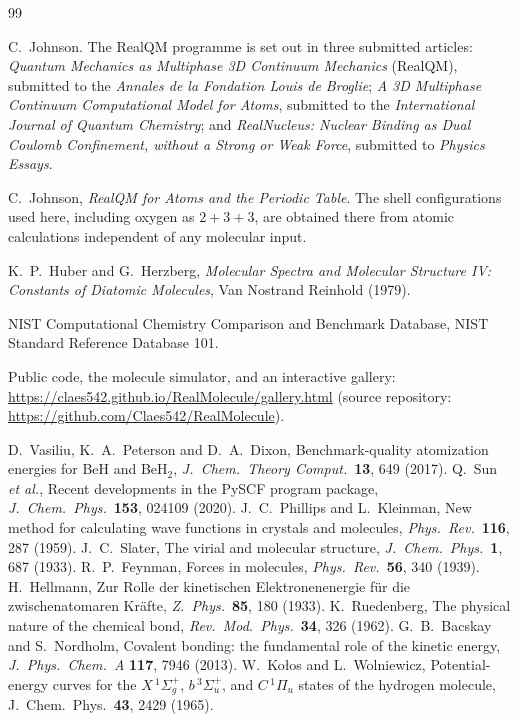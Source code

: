 \documentclass[11pt]{article}
\begin{document}
\begin{thebibliography}{99}

 C.\ Johnson. The RealQM programme is set out in three submitted articles:
\emph{Quantum Mechanics as Multiphase 3D Continuum Mechanics} (RealQM), submitted to the
\emph{Annales de la Fondation Louis de Broglie}; \emph{A 3D Multiphase Continuum Computational
Model for Atoms}, submitted to the \emph{International Journal of Quantum Chemistry}; and
\emph{RealNucleus: Nuclear Binding as Dual Coulomb Confinement, without a Strong or Weak Force},
submitted to \emph{Physics Essays}.

 C.\ Johnson, \emph{RealQM for Atoms and the Periodic Table}. The shell
configurations used here, including oxygen as $2{+}3{+}3$, are obtained there from atomic
calculations independent of any molecular input.

 K.\ P.\ Huber and G.\ Herzberg, \emph{Molecular Spectra and Molecular Structure
IV: Constants of Diatomic Molecules}, Van Nostrand Reinhold (1979).

 NIST Computational Chemistry Comparison and Benchmark Database, NIST Standard
Reference Database 101.

 Public code, the molecule simulator, and an interactive gallery:
\url{https://claes542.github.io/RealMolecule/gallery.html} (source repository:
\url{https://github.com/Claes542/RealMolecule}).

 D.\ Vasiliu, K.\ A.\ Peterson and D.\ A.\ Dixon, Benchmark-quality atomization energies
for BeH and BeH$_2$, \emph{J.\ Chem.\ Theory Comput.}\ \textbf{13}, 649 (2017).
 Q.\ Sun \emph{et al.}, Recent developments in the PySCF program package, \emph{J.\ Chem.\
  Phys.}\ \textbf{153}, 024109 (2020).
 J.\ C.\ Phillips and L.\ Kleinman, New method for calculating wave functions in crystals and
  molecules, \emph{Phys.\ Rev.}\ \textbf{116}, 287 (1959).
 J.\ C.\ Slater, The virial and molecular structure, \emph{J.\ Chem.\ Phys.}\
\textbf{1}, 687 (1933).
\bibitem{feynman} R.\ P.\ Feynman, Forces in molecules, \emph{Phys.\ Rev.}\ \textbf{56}, 340 (1939).
\bibitem{hellmann} H.\ Hellmann, Zur Rolle der kinetischen Elektronenenergie f\"ur die
zwischenatomaren Kr\"afte, \emph{Z.\ Phys.}\ \textbf{85}, 180 (1933).
\bibitem{ruedenberg} K.\ Ruedenberg, The physical nature of the chemical bond, \emph{Rev.\ Mod.\
Phys.}\ \textbf{34}, 326 (1962).
\bibitem{bacskay} G.\ B.\ Bacskay and S.\ Nordholm, Covalent bonding: the fundamental role of the
kinetic energy, \emph{J.\ Phys.\ Chem.\ A} \textbf{117}, 7946 (2013).
\bibitem{kolosw} W.\ Ko\l{}os and L.\ Wolniewicz, Potential-energy curves for the $X\,^1\Sigma_g^+$,
$b\,^3\Sigma_u^+$, and $C\,^1\Pi_u$ states of the hydrogen molecule, J.\ Chem.\ Phys.\ \textbf{43}, 2429 (1965).


\end{thebibliography}
\end{document}
